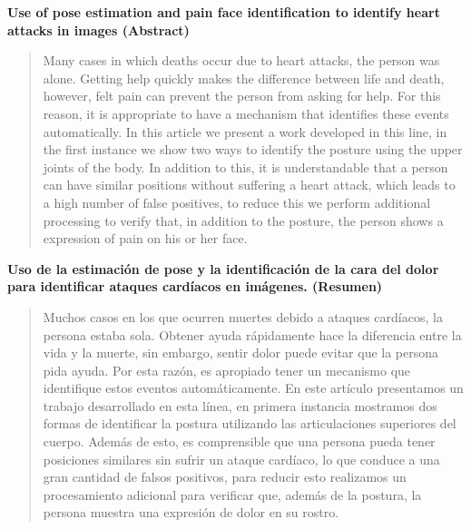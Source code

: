         \textbf{Use of pose estimation and pain face identification to identify heart attacks in images (Abstract)}
        \begin{quote}
        Many cases in which deaths occur due to heart attacks, the person was alone. Getting help quickly makes the difference between life and death, however, felt pain can prevent the person from asking for help. For this reason, it is appropriate to have a mechanism that identifies these events automatically. In this article we present a work developed in this line, in the first instance we show two ways to identify the posture using the upper joints of the body. In addition to this, it is understandable that a person can have similar positions without suffering a heart attack, which leads to a high number of false positives, to reduce this we perform additional processing to verify that, in addition to the posture, the person shows a expression of pain on his or her face.
        \end{quote}
        \textbf{Uso de la estimación de pose y la identificación de la cara del dolor para identificar ataques cardíacos en imágenes. (Resumen)}
        \begin{quote}
        Muchos casos en los que ocurren muertes debido a ataques cardíacos, la persona estaba sola. Obtener ayuda rápidamente hace la diferencia entre la vida y la muerte, sin embargo, sentir dolor puede evitar que la persona pida ayuda. Por esta razón, es apropiado tener un mecanismo que identifique estos eventos automáticamente. En este artículo presentamos un trabajo desarrollado en esta línea, en primera instancia mostramos dos formas de identificar la postura utilizando las articulaciones superiores del cuerpo. Además de esto, es comprensible que una persona pueda tener posiciones similares sin sufrir un ataque cardíaco, lo que conduce a una gran cantidad de falsos positivos, para reducir esto realizamos un procesamiento adicional para verificar que, además de la postura, la persona muestra una expresión de dolor en su rostro.
        \end{quote}
        
